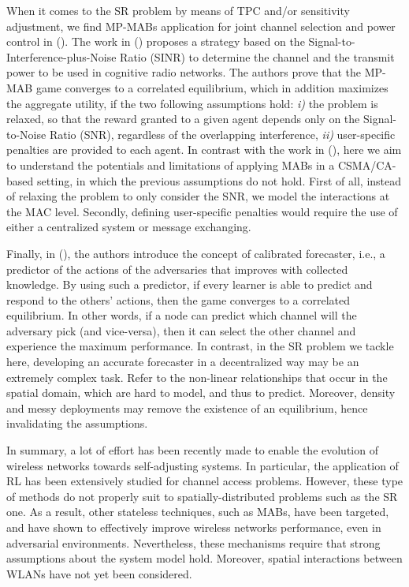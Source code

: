 \documentclass{article}
\begin{document}
When it comes to the SR problem by means of TPC and/or sensitivity adjustment, we find MP-MABs application for joint channel selection and power control in (\citealp{maghsudi2015joint, maghsudi2015channel}). The work in (\citealp{maghsudi2015joint}) proposes a strategy based on the Signal-to-Interference-plus-Noise Ratio (SINR) to determine the channel and the transmit power to be used in cognitive radio networks. The authors prove that the MP-MAB game converges to a correlated equilibrium, which in addition maximizes the aggregate utility, if the two following assumptions hold: \emph{i)} the problem is relaxed, so that the reward granted to a given agent depends only on the Signal-to-Noise Ratio (SNR), regardless of the overlapping interference, \emph{ii)} user-specific penalties are provided to each agent. In contrast with the work in (\citealp{maghsudi2015joint}), here we aim to understand the potentials and limitations of applying MABs in a CSMA/CA-based setting, in which the previous assumptions do not hold. First of all, instead of relaxing the problem to only consider the SNR, we model the interactions at the MAC level. Secondly, defining user-specific penalties would require the use of either a centralized system or message exchanging.

Finally, in (\citealp{maghsudi2015channel}), the authors introduce the concept of calibrated forecaster, i.e., a predictor of the actions of the adversaries that improves with collected knowledge. By using such a predictor, if every learner is able to predict and respond to the others' actions, then the game converges to a correlated equilibrium. In other words, if a node can predict which channel will the adversary pick (and vice-versa), then it can select the other channel and experience the maximum performance. In contrast, in the SR problem we tackle here, developing an accurate forecaster in a decentralized way may be an extremely complex task. Refer to the non-linear relationships that occur in the spatial domain, which are hard to model, and thus to predict. Moreover, density and messy deployments may remove the existence of an equilibrium, hence invalidating the assumptions.

In summary, a lot of effort has been recently made to enable the evolution of wireless networks towards self-adjusting systems. In particular, the application of RL has been extensively studied for channel access problems. However, these type of methods do not properly suit to spatially-distributed problems such as the SR one. As a result, other stateless techniques, such as MABs, have been targeted, and have shown to effectively improve wireless networks performance, even in adversarial environments. Nevertheless, these mechanisms require that strong assumptions about the system model hold. Moreover, spatial interactions between WLANs have not yet been considered.
\end{document}
